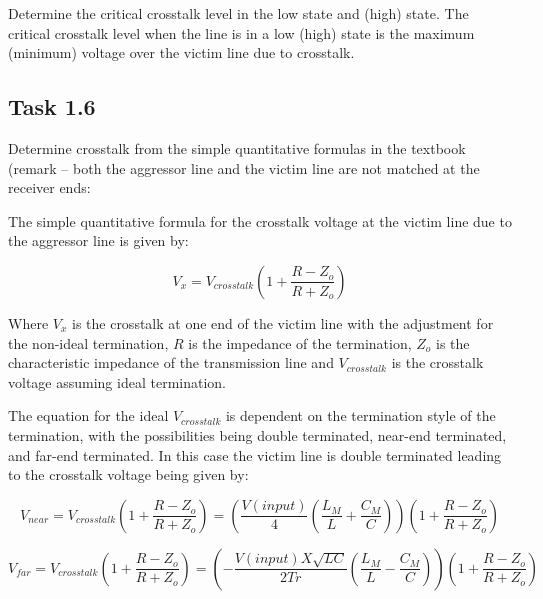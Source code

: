 \documentclass[../main.tex]{subfiles}
\begin{document}
\vspace{10pt}
Determine the critical crosstalk level in the low state and (high) state. The critical crosstalk level when the line is in a low (high) state is the maximum (minimum) voltage over the victim line due to crosstalk.

\solution

\subsection{Task 1.6}


Determine crosstalk from the simple quantitative formulas in the textbook (remark – both the aggressor line and the victim line are not matched at the receiver ends:

\solution

The simple quantitative formula for the crosstalk voltage at the victim line due to the aggressor line is given by:

\begin{equation*}
    V_x = V_{crosstalk} (1+ \frac{R-Z_o}{R+Z_o}) 
\end{equation*}

Where $V_x$ is the crosstalk at one end of the victim line with the adjustment for the non-ideal termination, $R$ is the impedance of the termination, $Z_o$ is the characteristic impedance of the transmission line and $V_{crosstalk}$ is the crosstalk voltage assuming ideal termination.

\vspace{10pt}

The equation for the ideal $V_{crosstalk}$ is dependent on the termination style of the termination, with the possibilities being double terminated, near-end terminated, and far-end terminated. In this case the victim line is double terminated leading to the crosstalk voltage being given by:

\begin{equation*}
    V_{near} = V_{crosstalk} \left(1+ \frac{R-Z_o}{R+Z_o} \right) = \left(\frac{V(input)}{4} \left(\frac{L_M}{L} + \frac{C_M}{C} \right) \right) \left(1+ \frac{R-Z_o}{R+Z_o} \right)
\end{equation*}

\begin{equation*}
    V_{far} = V_{crosstalk} \left(1+ \frac{R-Z_o}{R+Z_o} \right) = \left(-\frac{V(input)X\sqrt{LC}}{2Tr} \left(\frac{L_M}{L} - \frac{C_M}{C} \right) \right) \left(1+ \frac{R-Z_o}{R+Z_o} \right)
\end{equation*}
\end{document}

